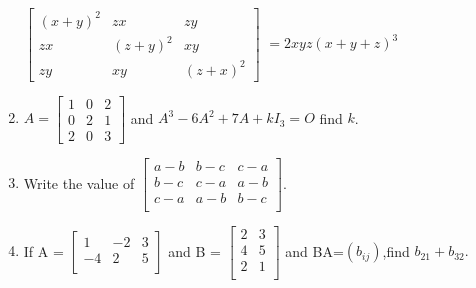 \begin{enumerate}
          $\begin{bmatrix}
                  (x+y)^2 & zx      & zy      \\
                  zx      & (z+y)^2 & xy      \\
                  zy      & xy      & (z+x)^2
              \end{bmatrix}$
          $=2xyz(x+y+z)^3$
    \item $A=\begin{bmatrix}
                  1 & 0 & 2 \\ 0 & 2 & 1\\ 2 & 0 & 3
              \end{bmatrix} $ and $A^3-6A^2+7A+kI_3=O$ find $k$.
    \item Write the value of  $\begin{bmatrix} a-b & b-c & c-a \\ b-c & c-a & a-b \\ c-a & a-b & b-c \\ \end{bmatrix}$.
    \item If A = $\begin{bmatrix} 1 & -2 & 3 \\-4  & 2  & 5\\ \end{bmatrix} $ and B = $\begin{bmatrix} 2 & 3 \\ 4 & 5 \\ 2 & 1 \\ \end{bmatrix}$ and BA=$(b_{ij})$,find $b_{21}+b_{32}.$


\end{enumerate}
